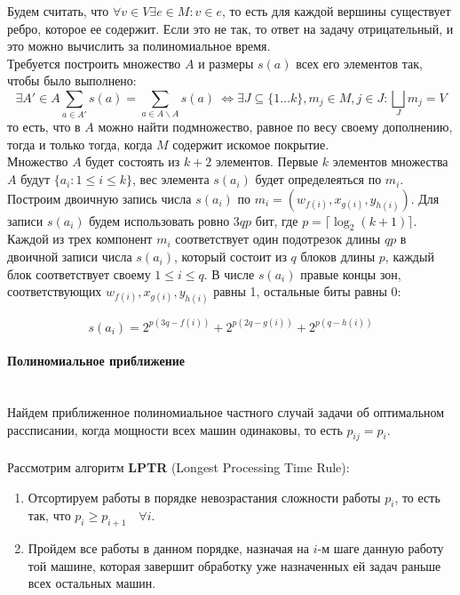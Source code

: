 \documentclass[10pt]{article}
\begin{document}
\begin{enumerate}
    Будем считать, что $\forall v \in V \exists e \in M: v \in e$, то есть для каждой вершины существует ребро, которое ее содержит. Если это не так, то ответ на задачу отрицательный, и это можно вычислить за полиномиальное время. \\
    Требуется построить множество $A$ и размеры $s(a)$ всех его элементов так, чтобы было выполнено: 
    \begin{equation}
        \exists A' \in A \sum_{a \in A'} s(a) = \sum_{a \in A \backslash A} s(a) \
        \iff \exists J \subseteq \{1\dots k\}, m_{j} \in M, j \in J : \bigsqcup_{J} m_j = V
    \end{equation}
    то есть, что в $A$ можно найти подмножество, равное по весу своему дополнению, тогда и только тогда, когда $M$ содержит искомое покрытие. \\
    Множество $A$ будет состоять из $k+2$ элементов. Первые $k$ элементов множества $A$ будут $\{ a_i: 1 \leq i \leq k\}$, вес элемента $s(a_i)$ будет определеяться по $m_i$. Построим двоичную запись числа $s(a_i)$ по $m_i = (w_{f(i)},x_{g(i)},y_{h(i)})$. Для записи $s(a_i)$ будем использовать ровно $3qp$ бит, где $p = \lceil \log_2{(k+1)} \rceil$. Каждой из трех компонент $m_i$ соответствует один подотрезок длины $qp$ в двоичной записи числа $s(a_i)$, который состоит из $q$ блоков длины $p$, каждый блок соответствует своему $1 \leq i \leq q$. В числе $s(a_i)$ правые концы зон, соответствующих $w_{f(i)}, x_{g(i)}, y_{h(i)}$ равны 1, остальные биты равны 0:

    \begin{equation}
        s(a_i) = 2^{p(3q - f(i))} + 2^{p(2q - g(i))} + 2^{p(q - h(i))}
    \end{equation}


\end{enumerate}
\paragraph{\Large{Полиномиальное приближение\\\\}}
\indent Найдем приближенное полиномиальное частного случай задачи об оптимальном рассписании, когда мощности всех машин одинаковы, то есть $p_{ij} = p_i$. \\ \\ 
Рассмотрим алгоритм \textbf{LPTR} (Longest Processing Time Rule): \\
\begin{enumerate}
    \item Отсортируем работы в порядке невозрастания сложности работы $p_i$, то есть так, что $p_i \geq p_{i+1} \quad \forall i$. 
    \item Пройдем все работы в данном порядке, назначая на $i$-м шаге данную работу той машине, которая завершит обработку уже назначенных ей задач раньше всех остальных машин.
\end{enumerate}
\end{document}

